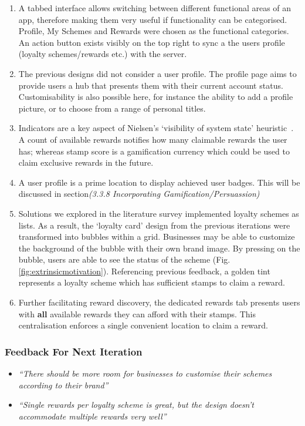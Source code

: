 \begin{enumerate}
  \item A tabbed interface allows switching between different functional areas of an app, therefore making them very useful if functionality can be categorised. Profile, My Schemes and Rewards were chosen as the functional categories. An action button exists visibly on the top right to sync a the users profile (loyalty schemes/rewards etc.) with the server.
  \item The previous designs did not consider a user profile. The profile page aims to provide users a hub that presents them with their current account status. Customisability is also possible here, for instance the ability to add a profile picture, or to choose from a range of personal titles.
  \item Indicators are a key aspect of Nielsen's `visibility of system state' heuristic~\cite{jakob}. A count of available rewards notifies how many claimable rewards the user has; whereas stamp score is a gamification currency which could be used to claim exclusive rewards in the future. 
  \item A user profile is a prime location to display achieved user badges. This will be discussed in section\textit{(3.3.8 Incorporating Gamification/Persuassion)}
  \item Solutions we explored in the literature survey implemented loyalty schemes as lists. As a result, the `loyalty card' design from the previous iterations were transformed into bubbles within a grid. Businesses may be able to customize the background of the bubble with their own brand image. By pressing on the bubble, users are able to see the status of the scheme (Fig. \ref{fig:extrinsicmotivation}). Referencing previous feedback, a golden tint represents a loyalty scheme which has sufficient stamps to claim a reward.
  \item Further facilitating reward discovery, the dedicated rewards tab presents users with \textbf{all} available rewards they can afford with their stamps. This centralisation enforces a single convenient location to claim a reward. 
\end{enumerate}

\subsubsection{Feedback For Next Iteration}
\begin{itemize}
  \item \textit{``There should be more room for businesses to customise their schemes according to their brand''}
  \item \textit{``Single rewards per loyalty scheme is great, but the design doesn't accommodate multiple rewards very well''}
\end{itemize}

